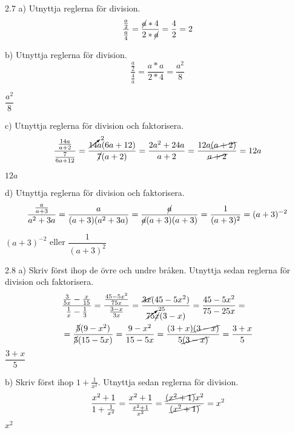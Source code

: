 \begin{task}{2.7 a)}
	Utnyttja reglerna för division.
	\[\dfrac{\frac{a}{2}}{\frac{a}{4}}=
	\dfrac{\cancel{a}*4}{2*\cancel{a}}=
	\dfrac{4}{2}=
	2\]
	
\end{task}

\begin{task}{b)}
	Utnyttja reglerna för division.
	\[\dfrac{\frac{a}{2}}{\frac{4}{a}}=
	\dfrac{a*a}{2*4}=
	\dfrac{a^2}{8}\]
	
	\ans $\dfrac{a^2}{8}$
\end{task}

\begin{task}{c)}
	Utnyttja reglerna för division och faktorisera.
	\[\dfrac{\frac{14a}{a+2}}{\frac{7}{6a+12}}=
	\dfrac{\cancelto{2}{14}a(6a+12)}{\cancel{7}(a+2)}=
	\dfrac{2a^2+24a}{a+2}=\dfrac{12a\cancel{(a+2)}}{\cancel{a+2}}=
	12a\]
	
	\ans $12a$
\end{task}

\begin{task}{d)}
	Utnyttja reglerna för division och faktorisera.
	\[\dfrac{\frac{a}{a+3}}{a^2+3a}=
	\dfrac{a}{(a+3)(a^2+3a)}=
	\dfrac{\cancel{a}}{\cancel{a}(a+3)(a+3)}=
	\dfrac{1}{(a+3)^2}=
	(a+3)^{-2}\]
	
	\ans $(a+3)^{-2}$ eller $\dfrac{1}{(a+3)^2}$
\end{task}

\begin{task}{2.8 a)}
	Skriv först ihop de övre och undre bråken. Utnyttja sedan reglerna för division och faktorisera.
	\begin{align*}
		&\dfrac{\frac{3}{5x}-\frac{x}{15}}{\frac{1}{x}-\frac{1}{3}}=
		\dfrac{\frac{45-5x^2}{75x}}{\frac{3-x}{3x}}=
		\dfrac{\cancel{3x}(45-5x^2)}{\cancelto{25}{75}\cancel{x}(3-x)}=
		\dfrac{45-5x^2}{75-25x}= \\
		&=\dfrac{\cancel{5}(9-x^2)}{\cancel{5}(15-5x)}=
		\dfrac{9-x^2}{15-5x}=
		\dfrac{(3+x)\cancel{(3-x)}}{5\cancel{(3-x)}}=
		\dfrac{3+x}{5}
	\end{align*}
	\ans $\dfrac{3+x}{5}$
\end{task}

\begin{task}{b)}
	Skriv först ihop $1+\frac{1}{x^2}$. Utnyttja sedan reglerna för division.
	\[\dfrac{x^2+1}{1+\frac{1}{x^2}}=
	\dfrac{x^2+1}{\frac{x^2+1}{x^2}}=
	\dfrac{\cancel{(x^2+1)}x^2}{\cancel{(x^2+1)}}=
	x^2\]
	\ans $x^2$
\end{task}


